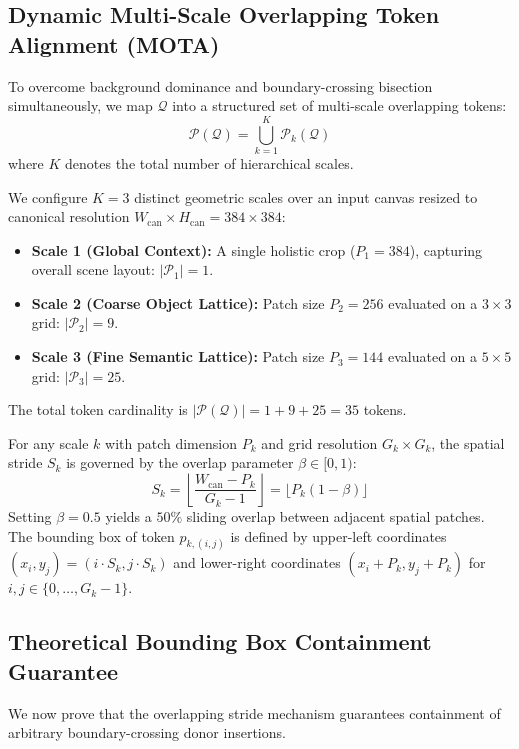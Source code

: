 \documentclass[journal]{IEEEtran}
\begin{document}
\subsection{Dynamic Multi-Scale Overlapping Token Alignment (MOTA)}
To overcome background dominance and boundary-crossing bisection simultaneously, we map $\mathcal{Q}$ into a structured set of multi-scale overlapping tokens:
\begin{equation}
\mathcal{P}(\mathcal{Q}) = \bigcup_{k=1}^K \mathcal{P}_k(\mathcal{Q})
\end{equation}
where $K$ denotes the total number of hierarchical scales. 

We configure $K=3$ distinct geometric scales over an input canvas resized to canonical resolution $W_{\text{can}} \times H_{\text{can}} = 384 \times 384$:
\begin{itemize}
    \item \textbf{Scale 1 (Global Context):} A single holistic crop ($P_1 = 384$), capturing overall scene layout: $|\mathcal{P}_1| = 1$.
    \item \textbf{Scale 2 (Coarse Object Lattice):} Patch size $P_2 = 256$ evaluated on a $3 \times 3$ grid: $|\mathcal{P}_2| = 9$.
    \item \textbf{Scale 3 (Fine Semantic Lattice):} Patch size $P_3 = 144$ evaluated on a $5 \times 5$ grid: $|\mathcal{P}_3| = 25$.
\end{itemize}
The total token cardinality is $|\mathcal{P}(\mathcal{Q})| = 1 + 9 + 25 = 35$ tokens.

For any scale $k$ with patch dimension $P_k$ and grid resolution $G_k \times G_k$, the spatial stride $S_k$ is governed by the overlap parameter $\beta \in [0, 1)$:
\begin{equation}
S_k = \left\lfloor \frac{W_{\text{can}} - P_k}{G_k - 1} \right\rfloor = \lfloor P_k (1 - \beta) \rfloor
\label{eq:stride}
\end{equation}
Setting $\beta = 0.5$ yields a $50\%$ sliding overlap between adjacent spatial patches. The bounding box of token $p_{k, (i, j)}$ is defined by upper-left coordinates $(x_i, y_j) = (i \cdot S_k, j \cdot S_k)$ and lower-right coordinates $(x_i + P_k, y_j + P_k)$ for $i, j \in \{0, \dots, G_k - 1\}$.

\subsection{Theoretical Bounding Box Containment Guarantee}
We now prove that the overlapping stride mechanism guarantees containment of arbitrary boundary-crossing donor insertions.
\end{document}
